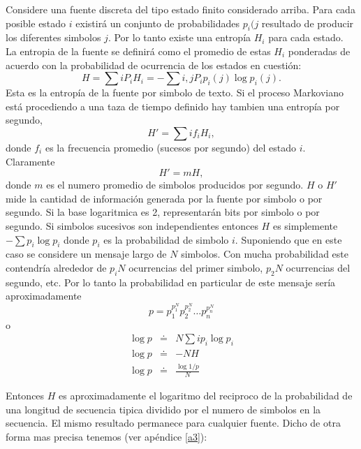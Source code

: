Considere una fuente discreta del tipo estado finito considerado
arriba. Para cada posible estado $i$ existir\'{a} un conjunto de
probabilidades $p_{i}(j$ resultado de producir los diferentes simbolos
$j$. Por lo tanto existe una entrop\'{i}a $H_{i}$ para cada estado. La
entropia de la fuente se definir\'{a} como el promedio de estas
$H_{i}$ ponderadas de acuerdo con la probabilidad de ocurrencia de los
estados en cuesti\'{o}n:
\begin{equation}
H = \sum{i}{} P_{i}H_{i}
  = - \sum{i,j}{} P_{i}p_{i}(j) \log p_{i}(j).
\end{equation}
Esta es la entrop\'{i}a de la fuente por simbolo de texto. Si el
proceso Markoviano est\'{a} procediendo a una taza de tiempo definido
hay tambien una entrop\'{i}a por segundo,
\begin{equation}
H' = \sum{i}{} f_{i}H_{i},
\end{equation}
donde $f_{i}$ es la frecuencia promedio (sucesos por segundo) del estado $i$. Claramente
\begin{equation}
H' = mH,
\end{equation}
donde $m$ es el numero promedio de simbolos producidos por
segundo. $H$ o $H'$ mide la cantidad de informaci\'{o}n generada por
la fuente por simbolo o por segundo. Si la base logaritmica es 2,
representar\'{a}n bits por simbolo o por segundo.  Si simbolos
sucesivos son independientes entonces $H$ es simplemente $-\sum p_{i}
\log p_{i}$ donde $p_{i}$ es la probabilidad de simbolo
$i$. Suponiendo que en este caso se considere un mensaje largo de $N$
simbolos. Con mucha probabilidad este contendr\'{i}a alrededor de
$p_{i}N$ ocurrencias del primer simbolo, $p_{2}N$ ocurrencias del
segundo, etc. Por lo tanto la probabilidad en particular de este
mensaje ser\'{i}a aproximadamente
\begin{equation}
p = p_{1}^{ p_{1}^{N}} p_{2}^{ p_{2}^{N}} \ldots p_{n}^{ p_{n}^{N}}
\end{equation}
o
\begin{equation}
\begin{array}{rcl}
\log p &\doteq& N \sum{i}{} p_{i} \log p_{i} \\
\log p &\doteq& -NH \\
\log p &\doteq& \frac{\log 1/p}{N}
\end{array}
\end{equation}

Entonces $H$ es aproximadamente el logaritmo del reciproco de la
probabilidad de una longitud de secuencia tipica dividido por el
numero de simbolos en la secuencia. El mismo resultado permanece para
cualquier fuente. Dicho de otra forma mas precisa tenemos (ver
ap\'{e}ndice \ref{a3}): 

